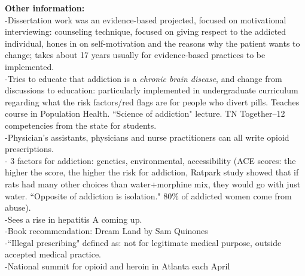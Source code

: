 \documentclass[12pt]{article}
\begin{document}
\noindent \textbf{Other information:} \\
-Dissertation work was an evidence-based projected, focused on motivational interviewing: counseling technique, focused on giving respect to the addicted individual, hones in on self-motivation and the reasons why the patient wants to change; takes about 17 years usually for evidence-based practices to be implemented. \\
-Tries to educate that addiction is a \textit{chronic brain disease}, and change from discussions to education: particularly implemented in undergraduate curriculum regarding what the risk factors/red flags are for people who divert pills. Teaches course in Population Health. ``Science of addiction" lecture. TN Together--12 competencies from the state for students.  \\
-Physician's assistants, physicians and nurse practitioners can all write opioid prescriptions. \\
- 3 factors for addiction: genetics, environmental, accessibility (ACE scores: the higher the score, the higher the risk for addiction, Ratpark study showed that if rats had many other choices than water+morphine mix, they would go with just water. ``Opposite of addiction is isolation." 80\% of addicted women come from abuse). \\
-Sees a rise in hepatitis A coming up. \\
-Book recommendation: Dream Land by Sam Quinones \\
-``Illegal prescribing" defined as: not for legitimate medical purpose, outside accepted medical practice. \\
-National summit for opioid and heroin in Atlanta each April   \\
\end{document}
